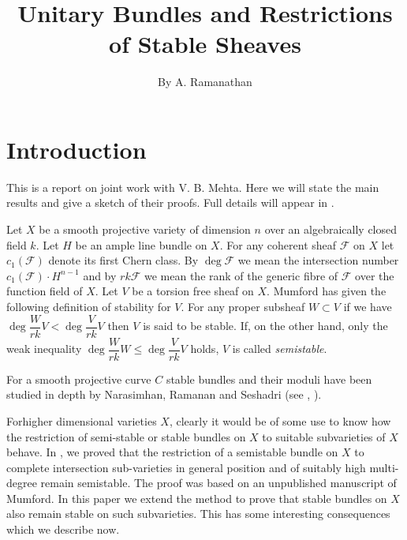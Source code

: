 \title{Unitary Bundles and Restrictions of Stable Sheaves}

\author{By A. Ramanathan}

\date{}
\maketitle


\setcounter{page}{373}
\setcounter{pageoriginal}{490}
\section{Introduction}\pageoriginale

This is a report on joint work with V. B. Mehta. Here we will state the main results and give a sketch of their proofs. Full details will appear in \cite{key4}.

Let $X$ be a smooth projective variety of dimension $n$ over an algebraically closed field $k$. Let $H$ be an ample line bundle on $X$. For any coherent sheaf $\mathscr{F}$ on $X$ let $c_1(\mathscr{F})$ denote its first Chern class. By $\deg \mathscr{F}$ we mean the intersection number $c_1(\mathscr{F})\cdot H^{n-1}$ and by $r k \mathscr{F}$ we mean the rank of the generic fibre of $\mathscr{F}$ over the function field of $X$. Let $V$ be a torsion free sheaf on $X$. Mumford has given the following definition of stability for $V$. For any proper subsheaf $W\subset V$ if we have $\deg \dfrac{W}{rk} V< \deg \dfrac{V}{rk} V$ then $V$ is said to be stable. If, on the other hand, only the weak inequality $\deg \dfrac{W}{rk} W\leq \deg \dfrac{V}{rk} V$ holds, $V$ is called \textit{semistable}. 

For a smooth projective curve $C$ stable bundles and their moduli have been studied in depth by Narasimhan, Ramanan and Seshadri (see \cite{key5}, \cite{key6}).

For\pageoriginale higher dimensional varieties $X$, clearly it would be of some use to know how the restriction of semi-stable or stable bundles on $X$ to suitable subvarieties of $X$ behave. In \cite{key3}, we proved that the restriction of a semistable bundle on $X$ to complete intersection sub-varieties in general position and of suitably high multi-degree remain semistable. The proof was based on an unpublished manuscript of Mumford. In this paper we extend the method to prove that stable bundles on $X$ also remain stable on such subvarieties. This has some interesting consequences which we describe now.

